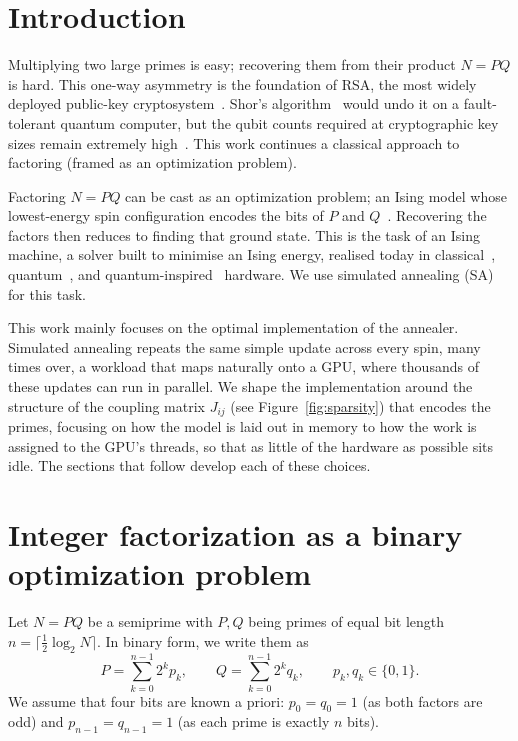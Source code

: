 \documentclass[pdflatex,sn-apa]{sn-jnl}%
\theoremstyle{thmstyleone}%
\theoremstyle{thmstyletwo}%
\theoremstyle{thmstylethree}%
\begin{document}
\section{Introduction}\label{sec:intro}

Multiplying two large primes is easy; recovering them from their product $N = PQ$ is hard. This one-way asymmetry is the foundation of RSA, the most widely deployed public-key cryptosystem~\citep{RSA1978}. Shor's algorithm~\citep{Shor1997} would undo it on a fault-tolerant quantum computer, but the qubit counts required at cryptographic key sizes remain extremely high~\citep{Jain2016}. This work continues a classical approach to factoring (framed as an optimization problem).

Factoring $N = PQ$ can be cast as an optimization problem; an Ising model whose lowest-energy spin configuration encodes the bits of $P$ and $Q$~\citep{Jiang2018,Wang2020}. Recovering the factors then reduces to finding that ground state. This is the task of an Ising machine, a solver built to minimise an Ising energy, realised today in classical~\citep{Aramon2019}, quantum~\citep{Johnson2011}, and quantum-inspired~\citep{Goto2019} hardware. We use simulated annealing (SA)~\citep{Kirkpatrick1983,Preis2009} for this task.

This work mainly focuses on the optimal implementation of the annealer. Simulated annealing repeats the same simple update across every spin, many times over, a workload that maps naturally onto a GPU, where thousands of these updates can run in parallel. We shape the implementation around the structure of the coupling matrix $J_{ij}$ (see Figure~\ref{fig:sparsity}) that encodes the primes, focusing on how the model is laid out in memory to how the work is assigned to the GPU's threads, so that as little of the hardware as possible sits idle. The sections that follow develop each of these choices.

\section{Integer factorization as a binary optimization problem}\label{sec:formulation}

Let $N = PQ$ be a semiprime with $P, Q$ being primes of equal bit length $n = \lceil \tfrac{1}{2}\log_2 N \rceil$. In binary form, we write them as
\begin{equation}
  P = \sum_{k=0}^{n-1} 2^k p_k,
  \qquad
  Q = \sum_{k=0}^{n-1} 2^k q_k,
  \qquad p_k,q_k \in \{0,1\}.
\end{equation}
We assume that four bits are known a priori: $p_0 = q_0 = 1$ (as both factors are odd) and $p_{n-1} = q_{n-1} = 1$ (as each prime is exactly $n$ bits).
\end{document}
